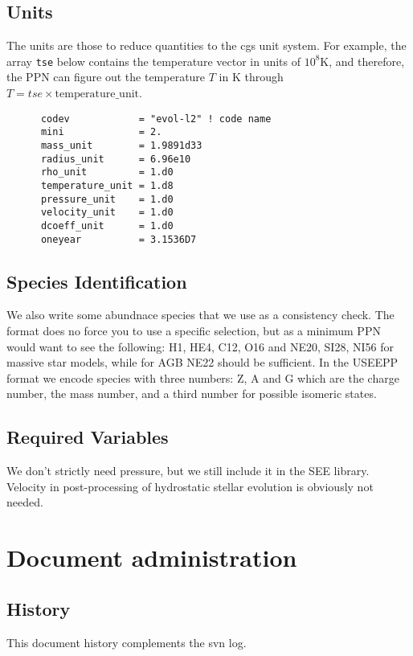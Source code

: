 \subsection{Units}

The units are those to reduce quantities to the cgs unit system. For
example, the array \texttt{tse} below contains the temperature vector
in units of $10^8\mathrm{K}$, and therefore, the PPN can figure out
the temperature $T$ in K through $T = tse \times \mathrm{temperature\_unit}$.

\begin{verbatim}
      codev            = "evol-l2" ! code name
      mini             = 2.
      mass_unit        = 1.9891d33
      radius_unit      = 6.96e10
      rho_unit         = 1.d0
      temperature_unit = 1.d8
      pressure_unit    = 1.d0
      velocity_unit    = 1.d0
      dcoeff_unit      = 1.d0
      oneyear          = 3.1536D7
\end{verbatim}


\subsection{Species Identification}

We also write some abundnace species that we
use as a consistency check. The format does no force you to use a
specific selection, but as a minimum PPN would want to see the
following: H1, HE4, C12, O16 and NE20, SI28, NI56 for massive star
models, while for AGB NE22 should be sufficient. In the USEEPP format
we encode species with three numbers: Z, A and G which are the charge
number, the mass number, and a third number for possible isomeric
states.

\subsection{Required Variables}

We don't strictly need pressure, but we still include it in the SEE
library. Velocity in post-processing of hydrostatic stellar evolution
is obviously not needed. 



\vfill
\section{Document administration}

\subsection{History} 
This document history complements the svn log.

